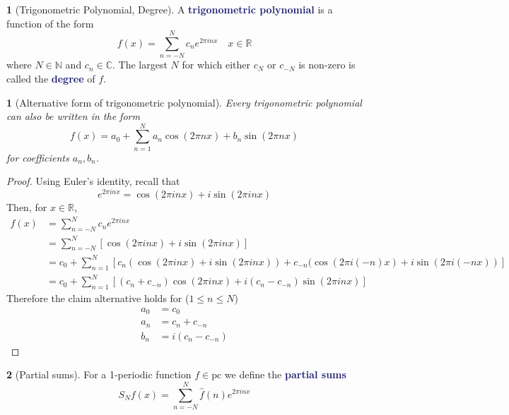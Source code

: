 \documentclass[11pt]{article}
\numberwithin{equation}{section}
\newcommand{\navy}[1]{\textcolor{MidnightBlue}{\bf #1}}
\theoremstyle{plain}
\newtheorem{claim}{\color{ForestGreen}{\textbf{Claim}}}[section]
\theoremstyle{definition}
\newtheorem{definition}{\color{MidnightBlue}{\textbf{Definition}}}[section]
\newcommand\squares[1]{\left[ #1 \right]}
\newcommand{\1}{\mathbbm 1}
\newcommand{\CC}{\mathbb C}
\newcommand{\RR}{\mathbb R}
\newcommand{\NN}{\mathbb N}
\begin{document}
\begin{definition}[Trigonometric Polynomial, Degree]
	A \navy{trigonometric polynomial} is a function of the form
	\begin{equation}
		f(x) = \sum_{n=-N}^N c_n e^{2\pi i n x} \quad x \in \RR
	\end{equation}
	where $N \in \NN$ and $c_n \in \CC$. The largest $N$ for which either $c_N$ or $c_{-N}$ is non-zero is called the \navy{degree} of $f$. 
\end{definition}


\begin{claim}[Alternative form of trigonometric polynomial]
	Every trigonometric polynomial can also be written in the form
	\begin{equation}
		f(x) = a_0 + \sum_{n=1}^N a_n \cos(2\pi n x) + b_n \sin(2\pi nx)
	\end{equation}
	for coefficients $a_n, b_n$. 
\end{claim}
\begin{proof}
	Using Euler's identity, recall that
	\begin{equation}
		e^{2\pi i n x} = \cos(2\pi i n x) + i \sin(2\pi i n x)
	\end{equation}
	Then, for $x \in \RR$,
	\begin{align*}
		f(x) &= \sum_{n=-N}^N c_n e^{2\pi i n x} \\
		&= \sum_{n=-N}^N \squares{\cos(2\pi i n x) + i \sin(2\pi i n x)} \\
		&= c_0 + \sum_{n=1}^N \squares{c_n(\cos(2\pi i n x) + i \sin(2\pi i n x)) + c_{-n}(\cos(2\pi i (-n) x) + i \sin(2\pi i (-n x))} \\
		&= c_0 + \sum_{n=1}^N \squares{(c_n + c_{-n})\cos(2\pi i n x) + i(c_n - c_{-n})\sin(2\pi i n x)}
	\end{align*}
	Therefore the claim alternative holds for ($1 \leq n \leq N$)
	\begin{align*}
		a_0 &= c_0 \\
		a_n &= c_n + c_{-n} \\
		b_n &= i(c_n - c_{-n})
	\end{align*}
	
\end{proof}

\begin{definition}[Partial sums]
	For a 1-periodic function $f \in \text{pc}$ we define the \navy{partial sums} 
	\begin{equation}
		S_Nf(x) = \sum_{n=-N}^N \hat{f}(n) e^{2\pi i nx}
	\end{equation}
\end{definition}
\end{document}
